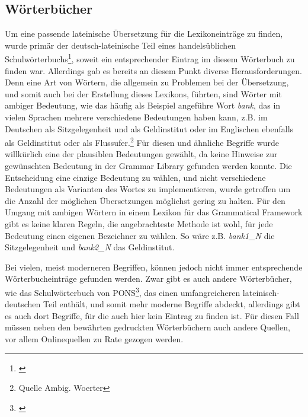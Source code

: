 \documentclass[12pt,abstract=on]{scrreprt}
\begin{document}
\subsection{Wörterbücher}
Um eine passende lateinische Übersetzung für die Lexikoneinträge zu finden, wurde primär der deutsch-lateinische Teil eines handelsüblichen Schulwörterbuchs\footnote{\cite{LANGENSCHEIDT1981}}, soweit ein entsprechender Eintrag im diesem Wörterbuch zu finden war. Allerdings gab es bereits an diesem Punkt diverse Herausforderungen. Denn eine Art von Wörtern, die allgemein zu Problemen bei der Übersetzung, und somit auch bei der Erstellung dieses Lexikons, führten, sind Wörter mit ambiger Bedeutung, wie das häufig als Beispiel angeführe Wort \textit{bank}, das in vielen Sprachen mehrere verschiedene Bedeutungen haben kann, z.B. im Deutschen als Sitzgelegenheit und als Geldinstitut oder im Englischen ebenfalls als Geldinstitut oder als Flussufer.\footnote{Quelle Ambig. Woerter} Für diesen und ähnliche Begriffe wurde willkürlich eine der plausiblen Bedeutungen gewählt, da keine Hinweise zur gewünschten Bedeutung in der Grammar Library gefunden werden konnte. Die Entscheidung eine einzige Bedeutung zu wählen, und nicht verschiedene Bedeutungen als Varianten des Wortes zu implementieren, wurde getroffen um die Anzahl der möglichen Übersetzungen möglichst gering zu halten. Für den Umgang mit ambigen Wörtern in einem Lexikon für das Grammatical Framework gibt es keine klaren Regeln, die angebrachteste Methode ist wohl, für jede Bedeutung einen eigenen Bezeichner zu wählen. So wäre z.B. \textit{bank1\_N} die Sitzgelegenheit und \textit{bank2\_N} das Geldinstitut.\par
Bei vielen, meist moderneren Begriffen, können jedoch nicht immer entsprechende Wörterbucheinträge gefunden werden. Zwar gibt es auch andere Wörterbücher, wie das Schulwörterbuch von PONS\footnote{\cite{PONS2012}}, das einen umfangreicheren lateinisch-deutschen Teil enthält, und somit mehr moderne Begriffe abdeckt, allerdings gibt es auch dort Begriffe, für die auch hier kein Eintrag zu finden ist. Für diesen Fall müssen neben den bewährten gedruckten Wörterbüchern auch andere Quellen, vor allem Onlinequellen zu Rate gezogen werden.\par
\end{document}
